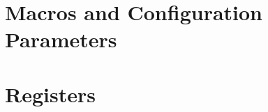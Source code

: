 \section{Macros and Configuration Parameters}
\label{sec:cfgparam}


\section{Registers}
\label{sec:regs}

